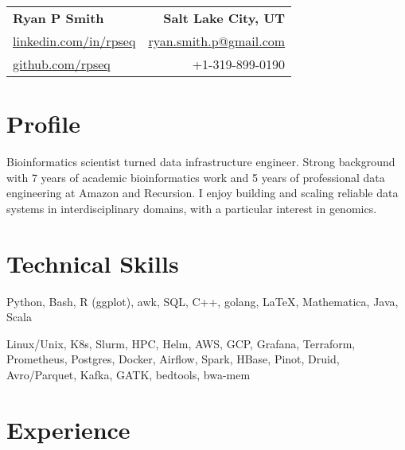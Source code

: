 
\RequirePackage{preamble}



\begin{tabular*}{\textwidth}{l@{\extracolsep{\fill}}r}
	\textbf{{\Large Ryan P Smith}} & \textbf{Salt Lake City, UT} \\
	\href{http://www.linkedin.com/in/rpseq}{linkedin.com/in/rpseq} &
	\href{mailto:ryan.smith.p@gmail.com}{ryan.smith.p@gmail.com} \\
	\href{https://github.com/RPSeq}{github.com/rpseq} & +1-319-899-0190 \\
\end{tabular*}

\section{Profile}

\small{Bioinformatics scientist turned data infrastructure engineer. Strong background with 7 years of academic bioinformatics work and 5 years of professional data engineering at Amazon and Recursion. I enjoy building and scaling reliable data systems in interdisciplinary domains, with a particular interest in genomics.}


\section{Technical Skills}
\resumeSubHeadingListStart

{Python, Bash, R (ggplot), awk, SQL, C++, golang, \LaTeX, Mathematica, Java, Scala}

{Linux/Unix, K8s, Slurm, HPC, Helm, AWS, GCP, Grafana, Terraform, Prometheus, Postgres, Docker, Airflow, Spark, HBase, Pinot, Druid, Avro/Parquet, Kafka, GATK, bedtools, bwa-mem}

\resumeSubHeadingListEnd

\section{Experience}
\resumeSubHeadingListStart


